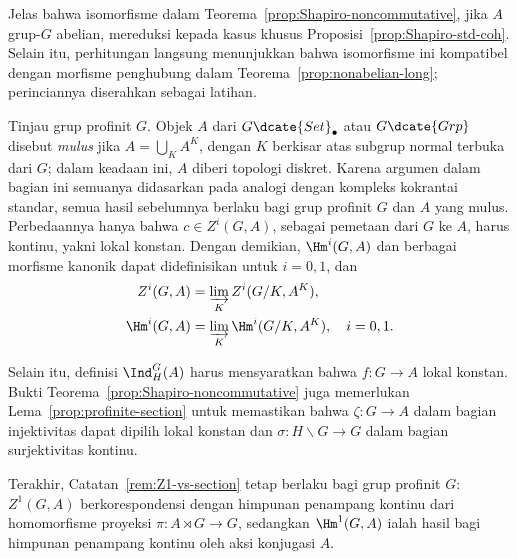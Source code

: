 Jelas bahwa isomorfisme dalam
Teorema~\ref{prop:Shapiro-noncommutative}, jika $A$ grup-$G$ abelian,
mereduksi kepada kasus khusus Proposisi~\ref{prop:Shapiro-std-coh}.
Selain itu, perhitungan langsung menunjukkan bahwa isomorfisme ini
kompatibel dengan morfisme penghubung dalam
Teorema~\ref{prop:nonabelian-long}; perinciannya diserahkan sebagai latihan.

\begin{catatan}\label{rem:pro-finite-coh-nonabelian}
	Tinjau grup profinit $G$. Objek $A$ dari $G\dcate{Set}_\bullet$ atau
	$G\dcate{Grp}$ disebut \emph{mulus} jika
	$A=\bigcup_KA^K$, dengan $K$ berkisar atas subgrup normal terbuka dari $G$;
	dalam keadaan ini, $A$ diberi topologi diskret. Karena argumen dalam
	bagian ini semuanya didasarkan pada analogi dengan kompleks kokrantai
	standar, semua hasil sebelumnya berlaku bagi grup profinit $G$ dan $A$
	yang mulus. Perbedaannya hanya bahwa $c\in Z^i(G,A)$, sebagai pemetaan dari
	$G$ ke $A$, harus kontinu, yakni lokal konstan. Dengan demikian,
	$\Hm^i(G,A)$ dan berbagai morfisme kanonik dapat didefinisikan untuk
	$i=0,1$, dan
	\begin{align*}
		Z^i(G, A) & = \varinjlim_K Z^i(G/K, A^K), \\
		\Hm^i(G, A) & = \varinjlim_K \Hm^i(G/K, A^K), \quad i = 0, 1.
	\end{align*}

	Selain itu, definisi $\Ind^G_H(A)$ harus mensyaratkan bahwa $f:G\to A$
	lokal konstan. Bukti Teorema~\ref{prop:Shapiro-noncommutative} juga
	memerlukan Lema~\ref{prop:profinite-section} untuk memastikan bahwa
	$\zeta:G\to A$ dalam bagian injektivitas dapat dipilih lokal konstan dan
	$\sigma:H\backslash G\to G$ dalam bagian surjektivitas kontinu.
	
	Terakhir, Catatan~\ref{rem:Z1-vs-section} tetap berlaku bagi grup profinit
	$G$: $Z^1(G,A)$ berkorespondensi dengan himpunan penampang kontinu dari
	homomorfisme proyeksi $\pi:A\rtimes G\to G$, sedangkan $\Hm^1(G,A)$ ialah
	hasil bagi himpunan penampang kontinu oleh aksi konjugasi $A$.
\end{catatan}
